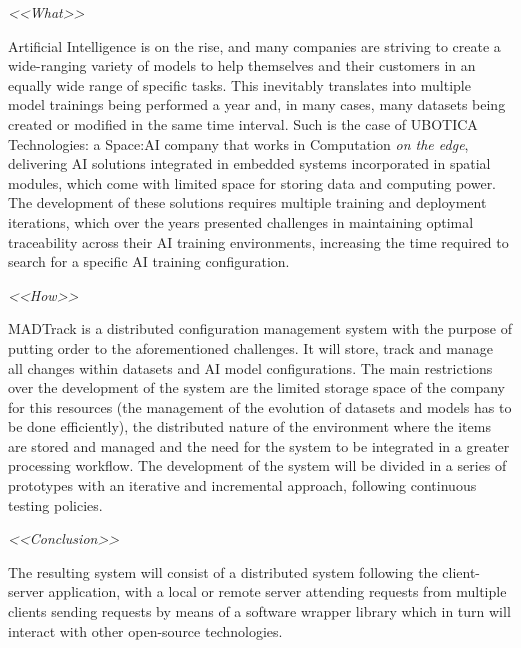 \pagestyle{plain}	%



\begin{resumenAlt}[english]{\tituloCortoAlt} 

\emph{<<What>>}

Artificial Intelligence is on the rise, and many companies are striving to create a wide-ranging variety of models to help themselves and their customers in an equally wide range of specific tasks. This inevitably translates into multiple model trainings being performed a year and, in many cases, many datasets being created or modified in the same time interval. 
Such is the case of UBOTICA Technologies: a Space:AI company that works in Computation \emph{on the edge}, delivering AI solutions integrated in embedded systems incorporated in spatial modules, which come with limited space for storing data and computing power. The development of these solutions requires multiple training and deployment iterations,
which over the years presented challenges in maintaining optimal traceability across their AI training environments, increasing the time required to search for a specific AI training configuration. 


\emph{<<How>>}

MADTrack is a distributed configuration management system with the purpose of putting order to the aforementioned challenges. It will store, track and manage all changes within datasets and AI model configurations. The main 
restrictions over the development of the system are the limited storage space of the company for this resources (the management of the evolution of datasets and models has to be done efficiently), the distributed nature of the environment where the items 
are stored and managed and the need for the system to be integrated in a greater processing workflow. The development of the system will be divided in a series of prototypes with an iterative and incremental approach, following continuous testing policies.



\emph{<<Conclusion>>}

The resulting system will consist of a distributed system following the client-server application, with a local or remote server attending requests from multiple clients sending requests by means of a software wrapper library which in turn will interact with other open-source technologies.

\end{resumenAlt}

